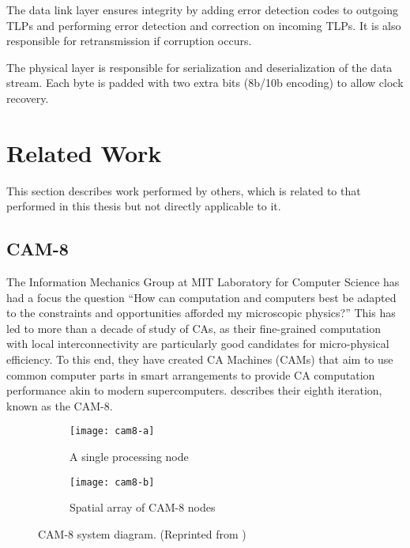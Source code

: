 The data link layer ensures integrity by adding error detection codes to outgoing TLPs and performing error detection and correction on incoming TLPs.
It is also responsible for retransmission if corruption occurs.

The physical layer is responsible for serialization and deserialization of the data stream.
Each byte is padded with two extra bits (8b/10b encoding) to allow clock recovery.


\section{Related Work}

This section describes work performed by others, which is related to that performed in this thesis but not directly applicable to it.


\subsection{CAM-8}

The Information Mechanics Group at MIT Laboratory for Computer Science has had a focus the question ``How can computation and computers best be adapted to the constraints and opportunities afforded my microscopic physics?''
This has led to more than a decade of study of CAs, as their fine-grained computation with local interconnectivity are particularly good candidates for micro-physical efficiency.
To this end, they have created CA Machines (CAMs) that aim to use common computer parts in smart arrangements to provide CA computation performance akin to modern supercomputers.
\cite{margolus1996cam8} describes their eighth iteration, known as the CAM-8.

\begin{figure}[!ht]
    \centering
    \begin{subfigure}{0.48\textwidth}
        \centering
        \texttt{[image: cam8-a]}
        \caption{A single processing node}
    \end{subfigure}
    \begin{subfigure}{0.48\textwidth}
        \centering
        \texttt{[image: cam8-b]}
        \caption{Spatial array of CAM-8 nodes}
    \end{subfigure}
    \caption[CAM-8 system diagram]{
        CAM-8 system diagram.
        (Reprinted from \cite{margolus1996cam8})
    }
    \label{fig:cam-8}
\end{figure}

